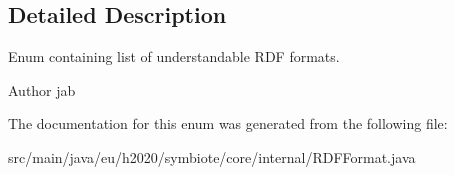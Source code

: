 \subsection{Detailed Description}
Enum containing list of understandable R\+DF formats.

\begin{DoxyAuthor}{Author}
jab 
\end{DoxyAuthor}


The documentation for this enum was generated from the following file\+:\begin{DoxyCompactItemize}
\item 
src/main/java/eu/h2020/symbiote/core/internal/R\+D\+F\+Format.\+java\end{DoxyCompactItemize}
